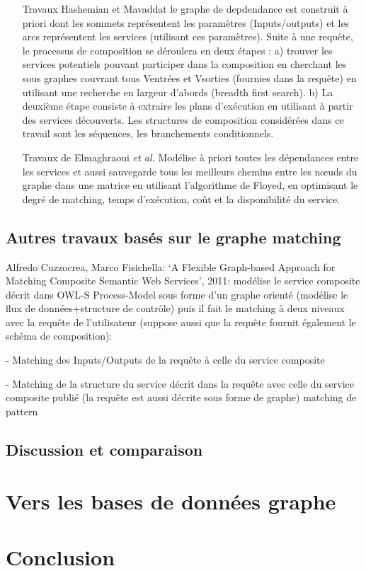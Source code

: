   \begin{itemize}
  \item[Travaux Hashemian et Mavaddat \cite{hashemian2006graph}] le
    graphe de depdendance est construit à priori dont les sommets
    représentent les paramètres (Inputs/outputs) et les arcs
    représentent les services (utilisant ces paramètres). Suite à une
    requête, le processus de composition se déroulera en deux étapes :
    a) trouver les services potentiels pouvant participer dans la
    composition en cherchant les sous graphes couvrant tous Ventrées
    et Vsorties (fournies dans la requête) en utilisant une recherche
    en largeur d'abords (breadth first search). b) La deuxième étape
    consiste à extraire les plans d'exécution en utilisant à partir
    des services découverts. Les structures de composition considérées
    dans ce travail sont les séquences, les branchements
    conditionnels.

  \item[Travaux de Elmaghraoui \textit{et al.} \cite{elmaghraoui2011graph}]
    Modélise à priori toutes les dépendances entre les services et
    aussi sauvegarde tous les meilleurs chemins entre les nœuds du
    graphe dans une matrice en utilisant l'algorithme de Floyed, en
    optimisant le degré de matching, temps d'exécution, coût et la
    disponibilité du service.
  \end{itemize}

  \subsection{Autres travaux basés sur le graphe matching}
  \label{sec:autres-travaux}
  Alfredo Cuzzocrea, Marco Fisichella: ‘A Flexible Graph-based
  Approach for Matching Composite Semantic Web Services’, 2011:
  modélise le service composite décrit dans OWL-S Process-Model sous
  forme d’un graphe orienté (modélise le flux de données+structure de
  contrôle) puis il fait le matching à deux niveaux avec la requête de
  l’utilisateur (suppose aussi que la requête fournit également le
  schéma de composition):

  - Matching des Inputs/Outputs de la requête
  à celle du service composite

  - Matching de la structure du service décrit dans la requête avec
  celle du service composite publié (la requête est aussi décrite sous
  forme de graphe) matching de pattern

  \subsection{Discussion et comparaison}
  \label{sec:discussion-comparaison}
\section{Vers les bases de données graphe}
\label{sec:vers-les-bases}

\section{Conclusion}
\label{sec:conclusion-2}

